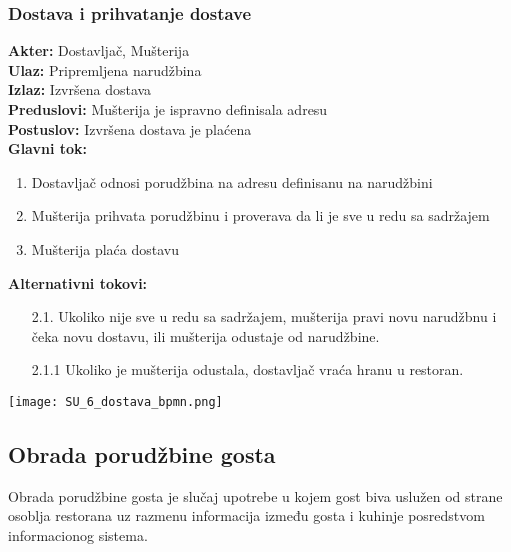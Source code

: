 \documentclass{article}
\begin{document}
\subsubsection{Dostava i prihvatanje dostave}
\textbf{Akter:} Dostavljač, Mušterija\\
\textbf{Ulaz:} Pripremljena narudžbina\\
\textbf{Izlaz:} Izvršena dostava\\
\textbf{Preduslovi:} Mušterija je ispravno definisala adresu\\
\textbf{Postuslov:}  Izvršena dostava je plaćena\\
\textbf{Glavni tok:}
\begin{enumerate}
\item Dostavljač odnosi porudžbina na adresu definisanu na narudžbini
\item Mušterija prihvata porudžbinu i proverava da li je sve u redu sa sadržajem
\item Mušterija plaća dostavu
\end{enumerate}
\textbf{Alternativni tokovi:}\\
\begin{itemize}
\item [2.1.]  Ukoliko nije sve u redu sa sadržajem, mušterija pravi novu narudžbnu i čeka novu dostavu, ili mušterija odustaje od narudžbine.
\item [2.1.1] Ukoliko je mušterija odustala, dostavljač vraća hranu u restoran.
\end{itemize}

\texttt{[image: SU\_6\_dostava\_bpmn.png]}


\subsection{Obrada porudžbine gosta}
Obrada porudžbine gosta je slučaj upotrebe u kojem gost biva uslužen od strane osoblja restorana uz razmenu informacija između gosta i kuhinje posredstvom informacionog sistema.
\end{document}
